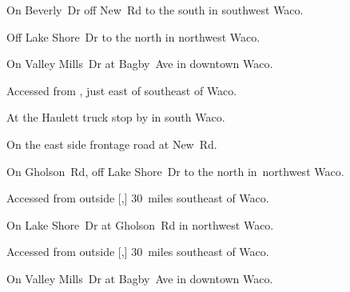
\begin{LocationList}

On Beverly~Dr off New~Rd to the south in southwest Waco.

Off  Lake Shore~Dr to the north in northwest Waco.

On  Valley Mills~Dr at Bagby~Ave in downtown Waco.

Accessed from , just east of  southeast of Waco.

At the Haulett truck stop by   in south Waco.

On the east side  frontage road at New~Rd.

On  Gholson~Rd, off  Lake Shore~Dr to the north in~northwest Waco.

Accessed from  outside [,] 30~miles southeast of Waco.

On  Lake Shore~Dr at  Gholson~Rd in northwest Waco.

Accessed from  outside [,] 30~miles southeast of Waco.

On  Valley Mills~Dr at Bagby~Ave in downtown Waco.

\end{LocationList}
